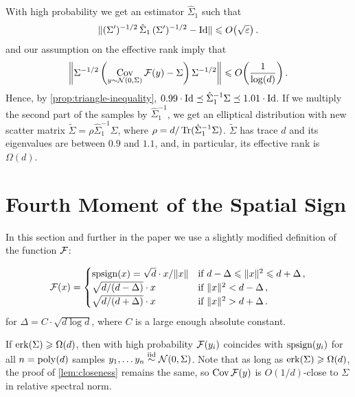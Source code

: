 With high probability we get an estimator $\hat{\Sigma}_1$ such that 
    \[
    \norm{(\Sigma')^{-1/2}\, \hat{\Sigma}_1\, (\Sigma')^{-1/2} - \Id} \le O\Paren{\sqrt{{\e}}}\,.
    \]
 and our assumption on the effective rank imply that 
    \[
    \Norm{\Sigma^{-1/2}\,
    \Paren{\Cov_{y \sim \cN(0,\Sigma)}{\cF(y)} - \Sigma}
    \,\Sigma^{-1/2}}  
    \le  O\Paren{\frac{1}{\log(d)}} \,.
    \]
Hence, by \cref{prop:triangle-inequality}, 
$0.99 \cdot \mathrm{Id} \preceq \hat{\Sigma}_1^{-1}\Sigma \preceq 1.01\cdot \mathrm{Id}$. 
If we multiply the second part of the samples by $\hat{\Sigma}_1^{-1}$, we get an elliptical distribution with new scatter matrix $\tilde{\Sigma} = \rho \hat{\Sigma}_1^{-1} \Sigma$, where $\rho = d/\operatorname{Tr}(\hat{\Sigma}_1^{-1} \Sigma)$. $\tilde{\Sigma}$ has trace $d$ and its eigenvalues are between $0.9$ and $1.1$, and, in particular, its effective rank is $\Omega(d)$.







\section{Fourth Moment of the Spatial Sign}
In this section and further in the paper we use a slightly modified definition of the function $\mathcal F$:
\begin{definition}\label{def:function}
    \[
    \mathcal F(x) = 
    \begin{cases}
        \textrm{spsign}(x) = {\sqrt{d}} \cdot x/{\lVert x\rVert} &\text{if } d-\Delta \leqslant \lVert x\rVert^2 \leqslant d+\Delta\,,\\
        \sqrt{d/(d-\Delta)}\cdot x &\text{if } \lVert x\rVert^2 < d-\Delta\,,\\
        \sqrt{d/(d+\Delta)}\cdot x &\text{if } \lVert x\rVert^2 > d+\Delta\,.
    \end{cases}
    \]    
for $\Delta = C\cdot \sqrt{d\log d}$, where $C$ is a large enough absolute constant.
\end{definition} 

If $\mathrm{erk}(\Sigma)\geqslant \Omega(d)$, then with high probability $\mathcal F(y_i)$ coincides with $\textrm{spsign}(y_i)$ for all $n=\operatorname{poly}(d)$ samples $y_1,\ldots y_n\stackrel{\text{iid}}\sim\mathcal N(0,\Sigma)$. Note that as long as $\mathrm{erk}(\Sigma) \geqslant \Omega(d)$, the proof of \cref{lem:closeness} remains the same, so $\operatorname*{\mathrm{Cov}} \mathcal F(y)$ is $O(1/d)$-close to $\Sigma$ in relative spectral norm.

